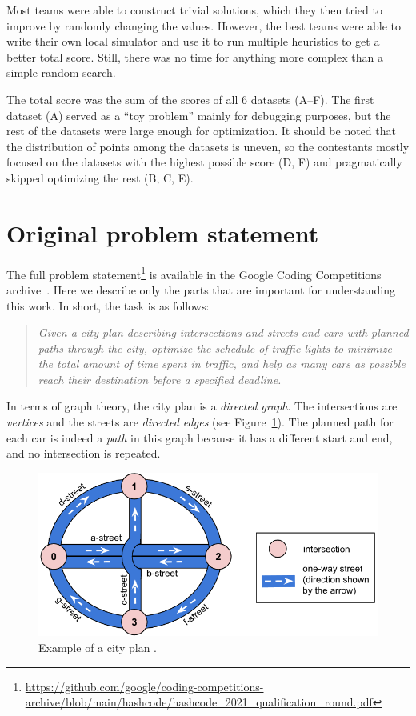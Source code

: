 Most teams were able to construct trivial solutions, which they then tried to improve by randomly changing the values. However, the best teams were able to write their own local simulator and use it to run multiple heuristics to get a better total score. Still, there was no time for anything more complex than a simple random search.

The total score was the sum of the scores of all 6 datasets (A--F). The first dataset (A) served as a ``toy problem'' mainly for debugging purposes, but the rest of the datasets were large enough for optimization. It should be noted that the distribution of points among the datasets is uneven, so the contestants mostly focused on the datasets with the highest possible score (D, F) and pragmatically skipped optimizing the rest (B, C, E).

\section{Original problem statement} \label{sec:original_problem_statement}

The full problem statement\footnote{\url{https://github.com/google/coding-competitions-archive/blob/main/hashcode/hashcode_2021_qualification_round.pdf}} is available in the Google Coding Competitions archive~\cite{google2023google}. Here we describe only the parts that are important for understanding this work.
In short, the task is as follows:
\begin{quote}
    \textit{Given a city plan describing intersections and streets and cars with planned paths through the city, optimize the schedule of traffic lights to minimize the total amount of time spent in traffic, and help as many cars as possible reach their destination before a specified deadline.}
\end{quote}
In terms of graph theory, the city plan is a \textit{directed graph}. The intersections are \textit{vertices} and the streets are \textit{directed edges} (see Figure~\ref{fig:hashcode_city_plan}). The planned path for each car is indeed a \textit{path} in this graph because it has a different start and end, and no intersection is repeated.

\begin{figure}
    \centering
    \includegraphics[width=\linewidth]{img/hashcode/figure1.png}
    \caption[Example of a city plan]{
        Example of a city plan \cite{google2023google}.
    }
    \label{fig:hashcode_city_plan}
\end{figure}

